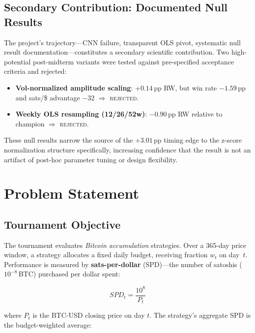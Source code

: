 \documentclass[11pt,letterpaper]{article}
\begin{document}
\subsection{Secondary Contribution: Documented Null Results}

The project's trajectory---CNN failure, transparent OLS pivot, systematic null
result documentation---constitutes a secondary scientific contribution.  Two
high-potential post-midterm variants were tested against pre-specified acceptance
criteria and rejected:

\begin{itemize}
  \item \textbf{Vol-normalized amplitude scaling}: $+0.14$\,pp RW, but win rate
    $-1.59$\,pp and sats/\$ advantage $-32$ $\Rightarrow$ \textsc{rejected}.
  \item \textbf{Weekly OLS resampling (12/26/52w)}: $-0.90$\,pp RW relative to
    champion $\Rightarrow$ \textsc{rejected}.
\end{itemize}

These null results narrow the source of the $+3.01$\,pp timing edge to the
z-score normalization structure specifically, increasing confidence that the
result is not an artifact of post-hoc parameter tuning or design flexibility.

\section{Problem Statement}
\label{sec:problem}

\subsection{Tournament Objective}

The tournament evaluates \emph{Bitcoin accumulation} strategies.  Over a 365-day
price window, a strategy allocates a fixed daily budget, receiving fraction $w_t$
on day~$t$.  Performance is measured by \textbf{sats-per-dollar} (SPD)---the
number of satoshis ($10^{-8}$\,BTC) purchased per dollar spent:

\begin{equation}
  SPD_t = \frac{10^8}{P_t}
  \label{eq:spd}
\end{equation}

where $P_t$ is the BTC-USD closing price on day $t$.  The strategy's aggregate
SPD is the budget-weighted average:
\end{document}
